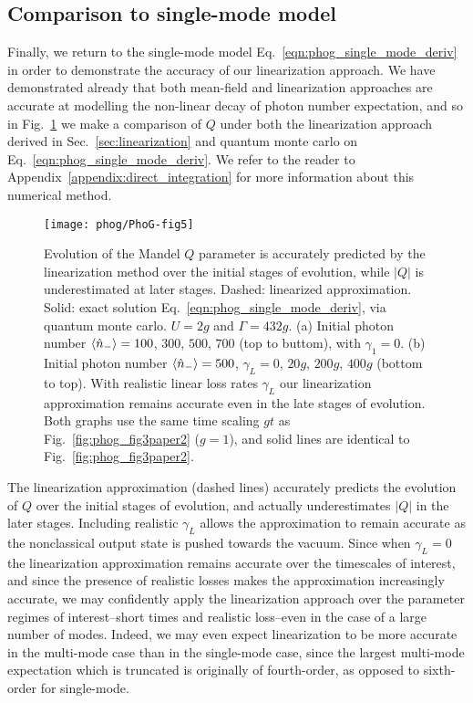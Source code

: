 \subsection{Comparison to single-mode model}
Finally, we return to the single-mode model Eq.~\ref{eqn:phog_single_mode_deriv} in order to demonstrate the accuracy of our linearization approach. We have demonstrated already that both mean-field and linearization approaches are accurate at modelling the non-linear decay of photon number expectation, and so in Fig.~\ref{fig:phog_single_mode_linearization} we make a comparison of $Q$ under both the linearization approach derived in Sec.~\ref{sec:linearization} and quantum monte carlo on Eq.~\ref{eqn:phog_single_mode_deriv}. We refer to the reader to Appendix~\ref{appendix:direct_integration} for more information about this numerical method.

\begin{figure}[htp]
\centering
\texttt{[image: phog/PhoG-fig5]}
\caption{\label{fig:phog_single_mode_linearization} Evolution of the Mandel $Q$ parameter is accurately predicted by the linearization method over the initial stages of evolution, while $\left|Q\right|$ is underestimated at later stages. Dashed: linearized approximation. Solid: exact solution Eq.~\ref{eqn:phog_single_mode_deriv}, via quantum monte carlo. $U = 2g$ and $\Gamma = 432g$. (a) Initial photon number $\ev{\hat{n}_-} = 100$, $300$, $500$, $700$ (top to buttom), with $\gamma_1 = 0$. (b) Initial photon number $\ev{\hat{n}_-}=500$, $\gamma_L = 0$, $20g$, $200g$, $400g$ (bottom to top). With realistic linear loss rates $\gamma_L$ our linearization approximation remains accurate even in the late stages of evolution. Both graphs use the same time scaling $g t$ as Fig.~\ref{fig:phog_fig3paper2} ($g=1$), and solid lines are identical to Fig.~\ref{fig:phog_fig3paper2}.}
\end{figure}

The linearization approximation (dashed lines) accurately predicts the evolution of $Q$ over the initial stages of evolution, and actually underestimates $\left|Q\right|$ in the later stages. Including realistic $\gamma_L$ allows the approximation to remain accurate as the nonclassical output state is pushed towards the vacuum. Since when $\gamma_L = 0$ the linearization approximation remains accurate over the timescales of interest, and since the presence of realistic losses makes the approximation increasingly accurate, we may confidently apply the linearization approach over the parameter regimes of interest--short times and realistic loss--even in the case of a large number of modes. Indeed, we may even expect linearization to be more accurate in the multi-mode case than in the single-mode case, since the largest multi-mode expectation which is truncated is originally of fourth-order, as opposed to sixth-order for single-mode.



